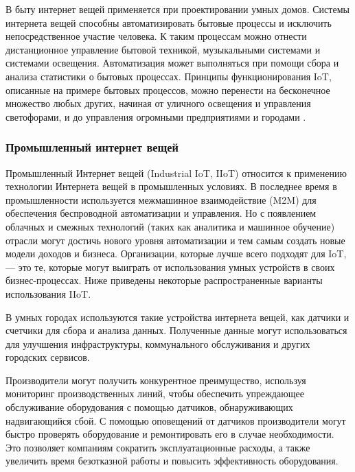 В быту интернет вещей применяется при проектировании умных домов. Системы интернета вещей способны автоматизировать бытовые процессы и исключить непосредственное участие человека. К таким процессам можно отнести дистанционное управление бытовой техникой, музыкальными системами и системами освещения. Автоматизация может выполняться при помощи сбора и анализа статистики о бытовых процессах. Принципы функционирования IoT, описанные на примере бытовых процессов, можно перенести на бесконечное множество любых других, начиная от уличного освещения и управления светофорами, и до управления огромными предприятиями и городами \cite{Kaspersky}.

\subsubsection{Промышленный интернет вещей}

Промышленный Интернет вещей (Industrial IoT, IIoT) \cite{Oracle} относится к применению технологии Интернета вещей в промышленных условиях. В последнее время в промышленности используется межмашинное взаимодействие (M2M) для обеспечения беспроводной автоматизации и управления. Но с появлением облачных и смежных технологий (таких как аналитика и машинное обучение) отрасли могут достичь нового уровня автоматизации и тем самым создать новые модели доходов и бизнеса. Организации, которые лучше всего подходят для IoT, --- это те, которые могут выиграть от использования умных устройств в своих бизнес-процессах. Ниже приведены некоторые распространенные варианты использования IIoT.


В умных городах используются такие устройства интернета вещей, как датчики и счетчики для сбора и анализа данных. Полученные данные могут использоваться для улучшения инфраструктуры, коммунального обслуживания и других городских сервисов.


Производители могут получить конкурентное преимущество, используя мониторинг производственных линий, чтобы обеспечить упреждающее обслуживание оборудования с помощью датчиков, обнаруживающих надвигающийся сбой. С помощью оповещений от датчиков производители могут быстро проверять оборудование и ремонтировать его в случае необходимости. Это позволяет компаниям сократить эксплуатационные расходы, а также увеличить время безотказной работы и повысить эффективность оборудования.

